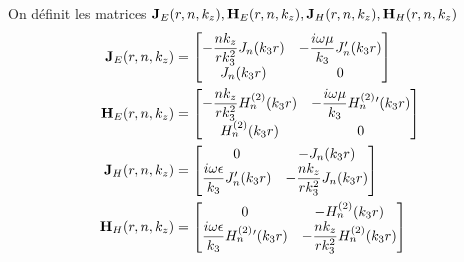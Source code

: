     \newcommand{\mJ}{\mat{J}}
    \newcommand{\mH}{\mat{H}}

    \begin{defn}
        On définit les matrices $\mJ_{E}(r,n,k_z),\mH_{E}(r,n,k_z),\mJ_{H}(r,n,k_z),\mH_{H}(r,n,k_z)$
        \begin{align}
            \mJ_{E}(r,n,k_z) &= 
            \begin{bmatrix}
                -\frac{nk_z}{rk_3^2}J_n(k_3r) & -\frac{i\w\mu}{k_3}J_n'(k_3r)
                \\
                J_n(k_3r) & 0
            \end{bmatrix}
            \\
            \mH_{E}(r,n,k_z) &= 
            \begin{bmatrix}
                -\frac{nk_z}{rk_3^2}H_n^{(2)}(k_3r) & -\frac{i\w\mu}{k_3}H_n^{(2)}{}'(k_3r)
                \\
                H_n^{(2)}(k_3r) & 0
            \end{bmatrix}
            \\
            \mJ_{H}(r,n,k_z) &= 
            \begin{bmatrix}
                0 & -J_n(k_3r)
                \\
                \frac{i\w\eps}{k_3}J_n'(k_3r) & -\frac{nk_z}{rk_3^2}J_n(k_3r)
            \end{bmatrix}
            \\
            \mH_{H}(r,n,k_z) &= 
            \begin{bmatrix}
                0 & -H_n^{(2)}(k_3r)
                \\
                \frac{i\w\eps}{k_3}H_n^{(2)}{}'(k_3r) & -\frac{nk_z}{rk_3^2}H_n^{(2)}(k_3r)
            \end{bmatrix}
        \end{align}
    \end{defn}


